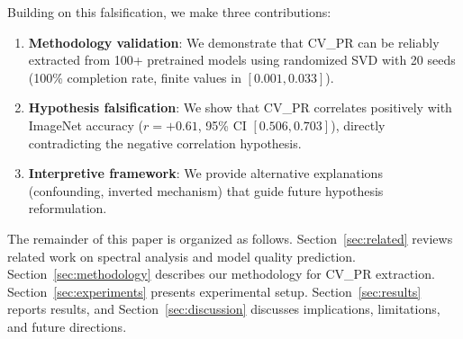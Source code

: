 Building on this falsification, we make three contributions:

\begin{enumerate}
    \item \textbf{Methodology validation}: We demonstrate that CV\_PR can be reliably extracted from 100+ pretrained models using randomized SVD with 20 seeds (100\% completion rate, finite values in $[0.001, 0.033]$).

    \item \textbf{Hypothesis falsification}: We show that CV\_PR correlates positively with ImageNet accuracy ($r = +0.61$, 95\% CI $[0.506, 0.703]$), directly contradicting the negative correlation hypothesis.

    \item \textbf{Interpretive framework}: We provide alternative explanations (confounding, inverted mechanism) that guide future hypothesis reformulation.
\end{enumerate}

The remainder of this paper is organized as follows. Section~\ref{sec:related} reviews related work on spectral analysis and model quality prediction. Section~\ref{sec:methodology} describes our methodology for CV\_PR extraction. Section~\ref{sec:experiments} presents experimental setup. Section~\ref{sec:results} reports results, and Section~\ref{sec:discussion} discusses implications, limitations, and future directions.
